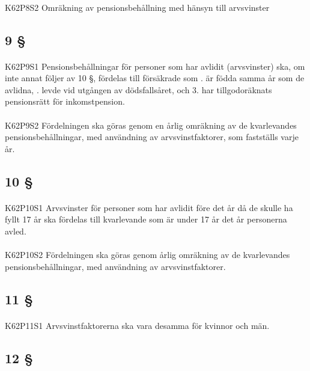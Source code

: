 \documentclass[a4paper,notitlepage,openany,10pt]{book}
\begin{document}
\paragraph*{}
{\tiny K62P8S2}
Omräkning av pensionsbehållning med hänsyn till arvsvinster
\subsection*{9 §}
\paragraph*{}
{\tiny K62P9S1}
Pensionsbehållningar för personer som har avlidit (arvsvinster) ska, om inte annat följer av 10 §, fördelas till försäkrade som
. är födda samma år som de avlidna,
. levde vid utgången av dödsfallsåret, och 3. har tillgodoräknats pensionsrätt för inkomstpension.
\paragraph*{}
{\tiny K62P9S2}
Fördelningen ska göras genom en årlig omräkning av de kvarlevandes pensionsbehållningar, med användning av arvsvinstfaktorer, som fastställs varje år.
\subsection*{10 §}
\paragraph*{}
{\tiny K62P10S1}
Arvsvinster för personer som har avlidit före det år då de skulle ha fyllt 17 år ska fördelas till kvarlevande som är under 17 år det år personerna avled.
\paragraph*{}
{\tiny K62P10S2}
Fördelningen ska göras genom årlig omräkning av de kvarlevandes pensionsbehållningar, med användning av arvsvinstfaktorer.
\subsection*{11 §}
\paragraph*{}
{\tiny K62P11S1}
Arvsvinstfaktorerna ska vara desamma för kvinnor och män.
\subsection*{12 §}
\end{document}
